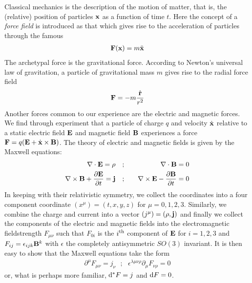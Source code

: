 \documentclass[12pt]{article}
\begin{document}
Classical mechanics is the description of the motion of matter, that is, the (relative) position of particles ${\bf x}$ as a function of time $t$. Here the concept of a {\em force field} %
is introduced as that which gives rise to the acceleration of particles through the famous
\begin{eqnarray}
\label{NII}
{\bf F}({\bf x})=m \ddot{\bf x}%
\end{eqnarray} 
The archetypal force is the gravitational force. According to Newton's universal law of gravitation, a particle of gravitational mass $m$ gives rise to the radial force field%
\begin{eqnarray}
{\bf F}=-m {\hat {\bf r}\over r^2}
\end{eqnarray}
Another forces common to our experience are the electric and magnetic forces. We find through experiment that a particle of charge $q$ and velocity $\dot{\bf x}$ relative to a static electric field ${\bf E}$ and magnetic field ${\bf B}$ experiences a force ${\bf F}=q( {\bf E}+\dot{\bf x}\times {\bf B})$. The theory of electric and magnetic fields is given by the Maxwell equations:
\begin{eqnarray}
\nabla \cdot {\bf E}=\rho ~~~&;&~~~\nabla \cdot {\bf B}=0\cr
\nabla \times {\bf B}+{\partial {\bf E}\over \partial t}={\bf j} ~~~&;&~~~\nabla \times {\bf E}-{\partial {\bf B}\over \partial t}=0
\end{eqnarray}
In keeping with their relativistic symmetry, we collect the coordinates into a four component coordinate $(x^\mu)=(t, x, y, z)$ for $\mu=0, 1, 2, 3$. Similarly, we combine the charge and current into a vector $(j^\mu)=(\rho, {\bf j})$ and finally we collect the components of the electric and magnetic fields into the electromagnetic fieldstrength $F_{\mu \nu}$ such that $F_{0i}$ is the $i^{\rm th}$ component of ${\bf E}$ for $i=1,2,3$ and $F_{ij}=\epsilon_{ijk} {\bf B}^k$ with $\epsilon$ the completely antisymmetric $SO(3)$ invariant. It is then easy to show that the Maxwell equations take the form
\begin{eqnarray}
\label{covMax}
\partial^\mu F_{\mu \nu}=j_\nu~~~;~~~\epsilon^{\lambda \mu\nu \rho} \partial_{\mu} F_{\nu \rho}=0
\end{eqnarray}
or, what is perhaps more familiar, ${\rm d}^* F=j$ and ${\rm d} F=0$.
\end{document}
